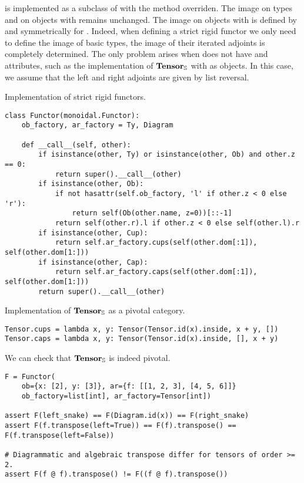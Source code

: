  is implemented as a subclass of  with the  method overriden.
The image on types and on objects  with  remains unchanged.
The image on objects  with  is defined by  and symmetrically for .
Indeed, when defining a strict rigid functor we only need to define the image of basic types, the image of their iterated adjoints is completely determined.
The only problem arises when  does not have  and  attributes, such as the implementation of $\mathbf{Tensor}_\S$ with  as objects.
In this case, we assume that the left and right adjoints are given by list reversal.

\begin{python}
{\normalfont Implementation of strict rigid functors.}
\begin{verbatim}
class Functor(monoidal.Functor):
    ob_factory, ar_factory = Ty, Diagram

    def __call__(self, other):
        if isinstance(other, Ty) or isinstance(other, Ob) and other.z == 0:
            return super().__call__(other)
        if isinstance(other, Ob):
            if not hasattr(self.ob_factory, 'l' if other.z < 0 else 'r'):
                return self(Ob(other.name, z=0))[::-1]
            return self(other.r).l if other.z < 0 else self(other.l).r
        if isinstance(other, Cup):
            return self.ar_factory.cups(self(other.dom[:1]), self(other.dom[1:]))
        if isinstance(other, Cap):
            return self.ar_factory.caps(self(other.dom[:1]), self(other.dom[1:]))
        return super().__call__(other)
\end{verbatim}
\end{python}

\begin{python}
{\normalfont Implementation of $\mathbf{Tensor}_\S$ as a pivotal category.}
\begin{verbatim}
Tensor.cups = lambda x, y: Tensor(Tensor.id(x).inside, x + y, [])
Tensor.caps = lambda x, y: Tensor(Tensor.id(x).inside, [], x + y)
\end{verbatim}
\end{python}


\begin{example}
We can check that $\mathbf{Tensor}_\S$ is indeed pivotal.

\begin{verbatim}
F = Functor(
    ob={x: [2], y: [3]}, ar={f: [[1, 2, 3], [4, 5, 6]]}
    ob_factory=list[int], ar_factory=Tensor[int])

assert F(left_snake) == F(Diagram.id(x)) == F(right_snake)
assert F(f.transpose(left=True)) == F(f).transpose() == F(f.transpose(left=False))

# Diagrammatic and algebraic transpose differ for tensors of order >= 2.
assert F(f @ f).transpose() != F((f @ f).transpose())
\end{verbatim}
\end{example}

